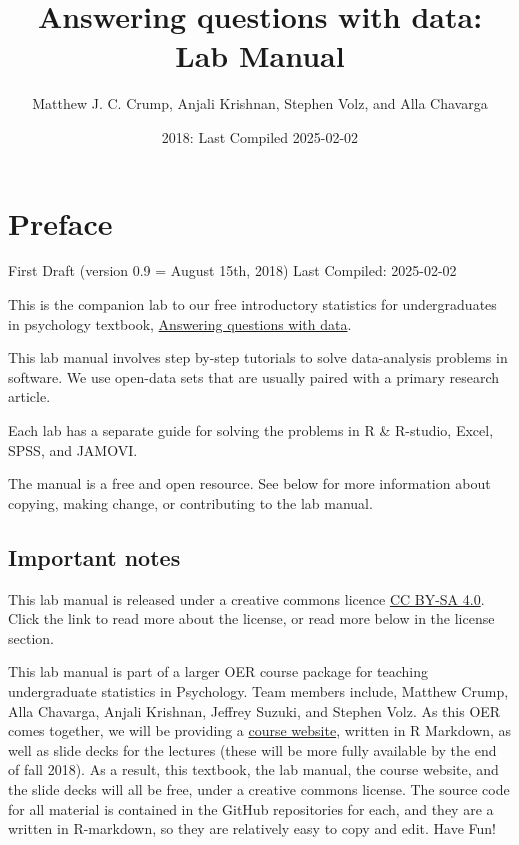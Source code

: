 \documentclass[
]{book}
\title{Answering questions with data: Lab Manual}
\author{Matthew J. C. Crump, Anjali Krishnan, Stephen Volz, and Alla Chavarga}
\date{2018: Last Compiled 2025-02-02}
\begin{document}
\maketitle

{
\setcounter{tocdepth}{1}
\tableofcontents
}
\hypertarget{preface}{%
\chapter*{Preface}\label{preface}}

First Draft (version 0.9 = August 15th, 2018)
Last Compiled: 2025-02-02

This is the companion lab to our free introductory statistics for undergraduates in psychology textbook, \href{https://crumplab.github.io/statistics/}{Answering questions with data}.

This lab manual involves step by-step tutorials to solve data-analysis problems in software. We use open-data sets that are usually paired with a primary research article.

Each lab has a separate guide for solving the problems in R \& R-studio, Excel, SPSS, and JAMOVI.

The manual is a free and open resource. See below for more information about copying, making change, or contributing to the lab manual.

\hypertarget{important-notes}{%
\section{Important notes}\label{important-notes}}

This lab manual is released under a creative commons licence \href{https://creativecommons.org/licenses/by-sa/4.0/}{CC BY-SA 4.0}. Click the link to read more about the license, or read more below in the license section.

This lab manual is part of a larger OER course package for teaching undergraduate statistics in Psychology. Team members include, Matthew Crump, Alla Chavarga, Anjali Krishnan, Jeffrey Suzuki, and Stephen Volz. As this OER comes together, we will be providing a \href{https://crumplab.github.io/psyc3400/}{course website}, written in R Markdown, as well as slide decks for the lectures (these will be more fully available by the end of fall 2018). As a result, this textbook, the lab manual, the course website, and the slide decks will all be free, under a creative commons license. The source code for all material is contained in the GitHub repositories for each, and they are a written in R-markdown, so they are relatively easy to copy and edit. Have Fun!
\end{document}

